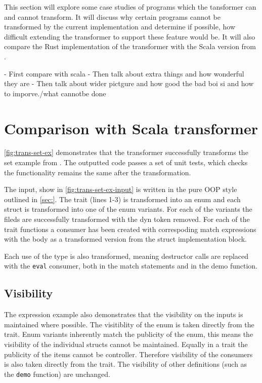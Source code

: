\documentclass[ oneside,%
                    author={James Elgar},
                    degree={MEng},
                     title={Bidirectional transformer between functional and \\ object-oriented programming in Rust},
                  subtitle={}]{dissertation}
\newcommand{\rust}[1]{\texttt{#1}}
\begin{document}
This section will explore some case studies of programs which the tansformer can and cannot transform. It will discuss why certain programs cannot be transformed by the current implementation and determine if possible, how difficult extending the transformer to support these feature would be. It will also compare the Rust implementation of the transformer with the Scala version from \cite{food}.

- First compare with scala
- Then talk about extra things and how wonderful they are
- Then talk about wider pictgure and how good the bad boi si and how to imporve./what cannotbe done  



\section{Comparison with Scala transformer} 

\autoref{fig:trans-set-ex} demonstrates that the transformer successfully transforms the set example from \cite{food}. 
The outputted code passes a set of unit tests, which checks the functionality remains the same after the transformation.

The input, show in \autoref{fig:trans-set-ex-input} is written in the pure OOP style outlined in \autoref{sec:}. The trait (lines 1-3) is transformed into an enum and each struct is transformed into one of the enum variants. For each of the variants the fileds are successfully transformed with the dyn token removed. For each of the trait functions a consumer has been created with correspoding match expressions with the body as a transformed version from the struct implementation block.

Each use of the type is also transformed, meaning destructor calls are replaced with the \rust{eval} consumer, both in the match statements and in the demo function.


\subsection{Visibility}

The expression example also demonstrates that the visibility on the inputs is maintained where possible. The visitiblity of the enum is taken directly from the trait. Enum variants inherently match the publicity of the enum, this means the visibility of the individual structs cannot be maintained. Equally in a trait the publicity of the items cannot be controller. Therefore visibility of the consumers is also taken directly from the trait. The visibility of other definitions (such as the \rust{demo} function) are unchanged.
\end{document}
